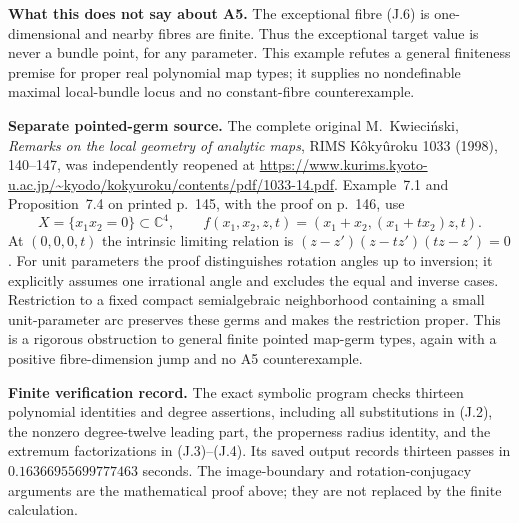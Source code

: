 \textbf{What this does not say about A5.}\quad
The exceptional fibre (J.6) is one-dimensional and nearby fibres are
finite. Thus the exceptional target value is never a bundle point,
for any parameter. This example refutes a general finiteness premise
for proper real polynomial map types; it supplies no nondefinable
maximal local-bundle locus and no constant-fibre counterexample.

\textbf{Separate pointed-germ source.}\quad
The complete original M.~Kwieci\'nski, \emph{Remarks on the local
geometry of analytic maps}, RIMS K\^oky\^uroku 1033 (1998), 140--147,
was independently reopened at
\url{https://www.kurims.kyoto-u.ac.jp/~kyodo/kokyuroku/contents/pdf/1033-14.pdf}.
Example~7.1 and Proposition~7.4 on printed p.~145, with the proof on
p.~146, use
\[
 X=\{x_1x_2=0\}\subset\mathbb C^4,\qquad
 f(x_1,x_2,z,t)=(x_1+x_2,(x_1+t x_2)z,t).
\]
At $(0,0,0,t)$ the intrinsic limiting relation is
$(z-z')(z-tz')(tz-z')=0$. For unit parameters the proof distinguishes
rotation angles up to inversion; it explicitly assumes one irrational
angle and excludes the equal and inverse cases. Restriction to a fixed
compact semialgebraic neighborhood containing a small unit-parameter
arc preserves these germs and makes the restriction proper. This is
a rigorous obstruction to general finite pointed map-germ types,
again with a positive fibre-dimension jump and no A5 counterexample.


\textbf{Finite verification record.}\quad
The exact symbolic program
checks thirteen polynomial identities and degree assertions, including
all substitutions in (J.2), the nonzero degree-twelve leading part,
the properness radius identity, and the extremum factorizations in
(J.3)--(J.4). Its saved output
records thirteen passes in $0.16366955699777463$ seconds. The
image-boundary and rotation-conjugacy arguments are the mathematical
proof above; they are not replaced by the finite calculation.
